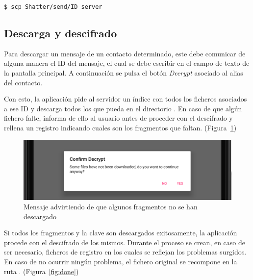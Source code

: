 \lstset{basicstyle=\ttfamily}
\begin{lstlisting}[language=bash]
  $ scp Shatter/send/ID server
\end{lstlisting}

\subsection{Descarga y descifrado}

Para descargar un mensaje de un contacto determinado, este debe comunicar de alguna manera el ID del mensaje, el cual se debe escribir en el campo de texto de la pantalla principal. A continuación se pulsa el botón \emph{Decrypt} asociado al alias del contacto.

Con esto, la aplicación pide al servidor un índice con todos los ficheros asociados a ese ID y descarga todos los que pueda en el directorio . En caso de que algún fichero falte, informa de ello al usuario antes de proceder con el descifrado y rellena un registro indicando cuales son los fragmentos que faltan. (Figura~\ref{fig:miss})

\begin{figure}[!htb]
  \centering
  \includegraphics[scale=0.4]{Figures/miss}
  \decoRule
  \caption[Shatter (Faltan fragmentos)]{Mensaje advirtiendo de que algunos fragmentos no se han descargado}
  \label{fig:miss}
\end{figure}

Si todos los fragmentos y la clave son descargados exitosamente, la aplicación procede con el descifrado de los mismos. Durante el proceso se crean, en caso de ser necesario, ficheros de registro en los cuales se reflejan los problemas surgidos. En caso de no ocurrir ningún problema, el fichero original se recompone en la ruta . (Figura~\ref{fig:done})

